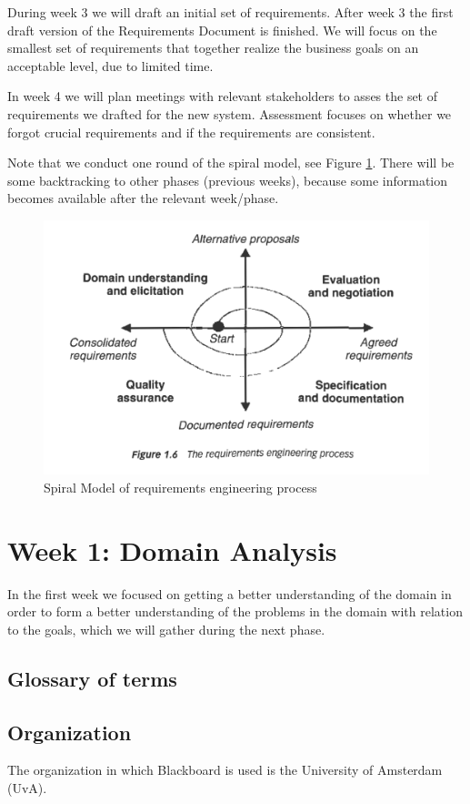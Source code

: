 During week 3 we will draft an initial set of requirements. After week 3 the first draft version of the Requirements Document is finished. We will focus on the smallest set of requirements that together realize the business goals on an acceptable level, due to limited time. 

In week 4 we will plan meetings with relevant stakeholders to asses the set of requirements we drafted for the new system. Assessment focuses on whether we forgot crucial requirements and if the requirements are consistent.  

Note that we conduct one round of the spiral model, see Figure \ref{fig:spiral_model}. There will be some backtracking to other phases (previous weeks), because some information becomes available after the relevant week/phase. 

\begin{figure}[h]
	\centering
	\includegraphics[width=0.75\linewidth]{images/re_process}
	\caption{Spiral Model of requirements engineering process}
	\label{fig:spiral_model}
\end{figure}


\chapter{Week 1: Domain Analysis}
In the first week we focused on getting a better understanding of the domain in order to form a better understanding of the problems in the domain with relation to the goals, which we will gather during the next phase.

\section{Glossary of terms}

\section{Organization}
The organization in which Blackboard is used is the University of Amsterdam (UvA). 

